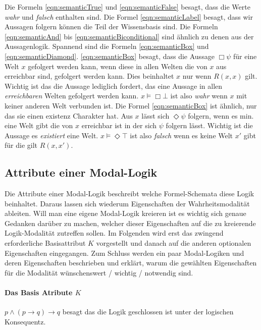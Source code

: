 Die Formeln \eqref{eqn:semanticTrue} und \eqref{eqn:semanticFalse} besagt, dass die Werte \emph{wahr} und \emph{falsch} enthalten sind. 
Die Formel \eqref{eqn:semanticLabel} besagt, dass wir Aussagen folgern können die Teil der Wissensbasis sind.
Die Formeln \eqref{eqn:semanticAnd} bis \eqref{eqn:semanticBiconditional} sind ähnlich zu denen aus der Aussagenlogik.
Spannend sind die Formeln \eqref{eqn:semanticBox} und \eqref{eqn:semanticDiamond}. 
\eqref{eqn:semanticBox} besagt, dass die Aussage $\Box\psi$ für eine Welt $x$ gefolgert werden kann, wenn diese in allen Welten die von $x$ aus erreichbar sind, gefolgert werden kann. Dies beinhaltet $x$ nur wenn $R(x,x)$ gilt.
Wichtig ist das die Aussage lediglich fordert, das eine Aussage in allen \emph{erreichbaren} Welten gefolgert werden kann. $x \vDash \Box \bot$ ist also \emph{wahr} wenn $x$ mit keiner anderen Welt verbunden ist.
Die Formel \eqref{eqn:semanticBox} ist ähnlich, nur das sie einen existenz Charakter hat. Aus $x$ lässt sich $\Diamond \psi$ folgern, wenn es min. eine Welt gibt die von $x$ erreichbar ist in der sich $\psi$ folgern lässt. Wichtig ist die Aussage es \emph{existiert} eine Welt. $x \vDash \Diamond \top$ ist also \emph{falsch} wenn es keine Welt $x'$ gibt für die gilt $R(x,x')$.



\subsection{Attribute einer Modal-Logik} %
\label{sub:attribute_einer_modal_logik}
Die Attribute einer Modal-Logik beschreibt welche Formel-Schemata diese Logik beinhaltet. Daraus lassen sich wiederum Eigenschaften der Wahrheitsmodalität ableiten. Will man eine eigene Modal-Logik kreieren ist es wichtig sich genaue Gedanken darüber zu machen, welcher dieser Eigenschaften auf die zu kreierende Logik-Modalität zutreffen sollen.
Im Folgenden wird erst das zwingend erforderliche Basisattribut $K$ vorgestellt und danach auf die anderen optionalen Eigenschaften eingegangen. 
Zum Schluss werden ein paar Modal-Logiken und deren Eigenschaften beschrieben und erklärt, warum die gewählten Eigenschaften für die Modalität wünschenswert / wichtig / notwendig sind.

\paragraph{Das Basis Atribute $K$} %
\label{par:das_basis_atribute_k_} $p \wedge (p \rightarrow q) \rightarrow q$ besagt das die Logik geschlossen ist unter der logischen Konsequentz. 

